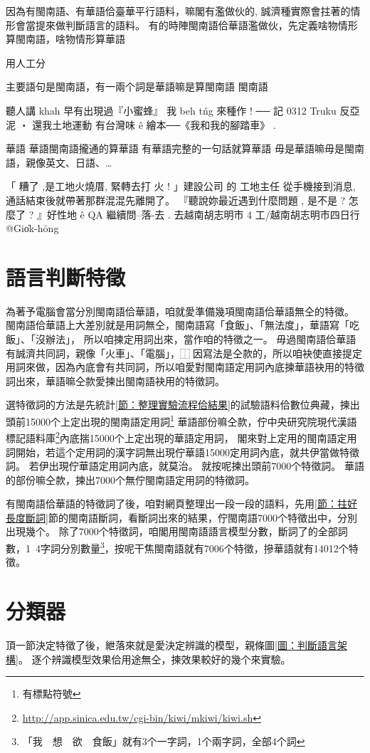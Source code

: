 \documentclass[final,oneside,onecolumn,12pt,a4paper]{book}%
\begin{document}
因為有閩南語、有華語佮臺華平行語料，嘛閣有濫做伙的, 誠濟種實際會拄著的情形會當提來做判斷語言的語料。
有的時陣閩南語佮華語濫做伙，先定義啥物情形算閩南語，啥物情形算華語

用人工分

主要語句是閩南語，有一兩个詞是華語嘛是算閩南語
閩南語

聽人講 khah 早有出現過『小蜜蜂』
我 beh tńg 來種作 ! ── 記 0312 Truku 反亞泥 ‧ 還我土地運動
有台灣味 ê 繪本──《我和我的腳踏車》 .

華語
華語閩南語攏通的算華語
有華語完整的一句話就算華語
毋是華語嘛毋是閩南語，親像英文、日語、…

「 糟了 ,是工地火燒厝, 緊轉去打 火 ! 」建設公司 的 工地主任 從手機接到消息,通話結束後就帶著那群混混先離開了。
『聽說妳最近遇到什麼問題 , 是不是 ? 怎麼了 ? 』好性地 ê QA 繼續問--落-去 .
去越南胡志明市 4 工/越南胡志明市四日行 @Gio̍k-hōng


\section{語言判斷特徵}
\label{節：語言判斷特徵}
為著予電腦會當分別閩南語佮華語，咱就愛準備幾項閩南語佮華語無仝的特徵。
閩南語佮華語上大差別就是用詞無仝，閩南語寫「食飯」、「無法度」，華語寫「吃飯」、「沒辦法」，
所以咱揀定用詞出來，當作咱的特徵之一。
毋過閩南語佮華語有誠濟共同詞，親像「火車」、「電腦」，⿰因寫法是仝款的，所以咱袂使直接提定用詞來做，因為內底會有共同詞，所以咱愛對閩南語定用詞內底揀華語袂用的特徵詞出來，華語嘛仝款愛揀出閩南語袂用的特徵詞。

選特徵詞的方法是先統計\ref{節：整理實驗流程佮結果}的試驗語料佮數位典藏，揀出頭前15000个上定出現的閩南語定用詞\footnote{有標點符號}
華語部份嘛仝款，佇中央研究院現代漢語標記語料庫\footnote{\url{http://app.sinica.edu.tw/cgi-bin/kiwi/mkiwi/kiwi.sh}}內底揣15000个上定出現的華語定用詞，
閣來對上定用的閩南語定用詞開始，若這个定用詞的漢字詞無出現佇華語15000定用詞內底，就共伊當做特徵詞。
若伊出現佇華語定用詞內底，就莫治。
就按呢揀出頭前7000个特徵詞。
華語的部份嘛仝款，揀出7000个無佇閩南語定用詞的特徵詞。


有閩南語佮華語的特徵詞了後，咱對網頁整理出一段一段的語料，先用\ref{節：拄好長度斷詞}節的閩南語斷詞，看斷詞出來的結果，佇閩南語7000个特徵出中，分別出現幾个。
除了7000个特徵詞，咱閣用閩南語語言模型分數，斷詞了的全部詞數，1~4字詞分別數量\footnote{「我　想　欲　食飯」就有3个一字詞，1个兩字詞，全部4个詞}，按呢干焦閩南語就有7006个特徵，摻華語就有14012个特徵。

\section{分類器}
\label{節：分類器}
頂一節決定特徵了後，紲落來就是愛決定辨識的模型，親條圖\ref{圖：判斷語言架構}。
逐个辨識模型效果佮用途無仝，揀效果較好的幾个來實驗。
\end{document}
